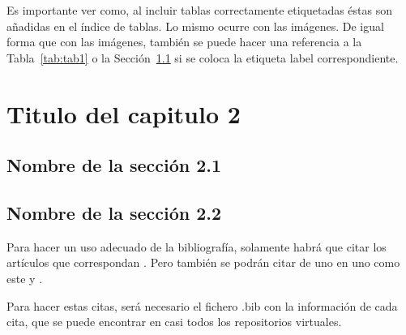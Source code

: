 Es importante ver como, al incluir tablas correctamente etiquetadas éstas son añadidas en el índice de tablas. Lo mismo ocurre con las imágenes.
De igual forma que con las imágenes, también se puede hacer una referencia a la Tabla~\ref{tab:tab1} o la Sección~\ref{sec:sec21} si se coloca la etiqueta label correspondiente.

\chapter{Titulo del capitulo 2}
\section{Nombre de la sección 2.1}
\label{sec:sec21}

\lipsum[56-58]

\section{Nombre de la sección 2.2}

Para hacer un uso adecuado de la bibliografía, solamente habrá que citar los artículos que correspondan \cite{guerreiro2017mismatch,ministerio_energia,benedetti2018anomaly,antonanzas2016review,darksky}. Pero también se podrán citar de uno en uno como este \cite{garoudja2017enhanced} y \cite{belaout2018multiclass}.

Para hacer estas citas, será necesario el fichero .bib con la información de cada cita, que se puede encontrar en casi todos los repositorios virtuales.
